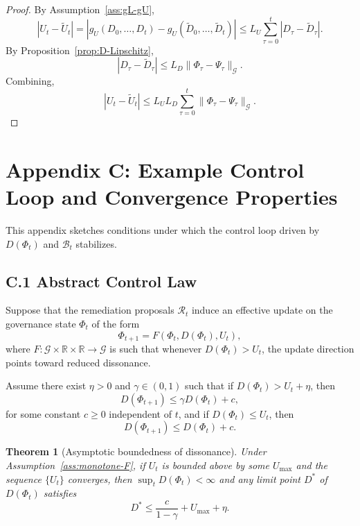 \documentclass[11pt]{article}
\newtheorem{theorem}{Theorem}[section]
\begin{document}
\begin{proof}
By Assumption~\ref{ass:gL-gU},
\[
  |U_t - \tilde{U}_t|
  = |g_U(D_0,\dots,D_t) - g_U(\tilde{D}_0,\dots,\tilde{D}_t)|
  \le L_U \sum_{\tau=0}^t |D_\tau - \tilde{D}_\tau|.
\]
By Proposition~\ref{prop:D-Lipschitz},
\[
  |D_\tau - \tilde{D}_\tau|
  \le L_D \|\Phi_\tau - \Psi_\tau\|_{\mathcal{G}}.
\]
Combining,
\[
  |U_t - \tilde{U}_t|
  \le L_U L_D \sum_{\tau=0}^t \|\Phi_\tau - \Psi_\tau\|_{\mathcal{G}}.
\]
\end{proof}

\section{Appendix C: Example Control Loop and Convergence Properties}

This appendix sketches conditions under which the control loop driven by $D(\Phi_t)$ and $\mathcal{B}_t$ stabilizes.

\subsection{C.1 Abstract Control Law}

Suppose that the remediation proposals $\mathcal{R}_t$ induce an effective update on the governance state $\Phi_t$ of the form
\[
  \Phi_{t+1} = F(\Phi_t, D(\Phi_t), U_t),
\]
where $F : \mathcal{G} \times \mathbb{R} \times \mathbb{R} \to \mathcal{G}$ is such that whenever $D(\Phi_t) > U_t$, the update direction points toward reduced dissonance.

\begin{assumption}\label{ass:monotone-F}
Assume there exist $\eta > 0$ and $\gamma \in (0,1)$ such that if $D(\Phi_t) > U_t + \eta$, then
\[
  D(\Phi_{t+1}) \le \gamma D(\Phi_t) + c,
\]
for some constant $c \ge 0$ independent of $t$, and if $D(\Phi_t) \le U_t$, then
\[
  D(\Phi_{t+1}) \le D(\Phi_t) + c.
\]
\end{assumption}

\begin{theorem}[Asymptotic boundedness of dissonance]\label{thm:D-bounded}
Under Assumption~\ref{ass:monotone-F}, if $U_t$ is bounded above by some $U_{\max}$ and the sequence $\{U_t\}$ converges, then $\sup_t D(\Phi_t) < \infty$ and any limit point $D^\ast$ of $D(\Phi_t)$ satisfies
\[
  D^\ast \le \frac{c}{1-\gamma} + U_{\max} + \eta.
\]
\end{theorem}
\end{document}
